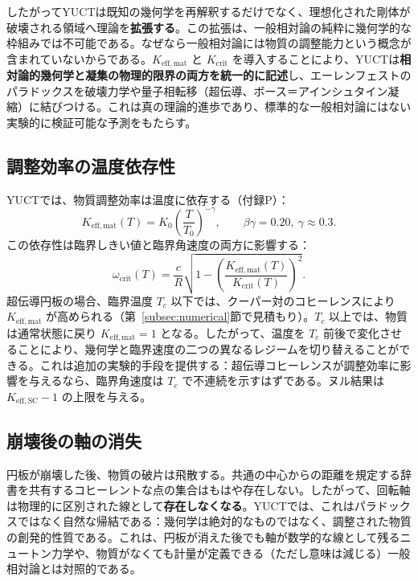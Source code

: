 \documentclass[12pt,a4paper]{article}
\newcommand{\Keffmat}{K_{\mathrm{eff,mat}}}
\newcommand{\Kcrit}{K_{\mathrm{crit}}}
\begin{document}
	したがってYUCTは既知の幾何学を再解釈するだけでなく、理想化された剛体が破壊される領域へ理論を\textbf{拡張する}。この拡張は、一般相対論の純粋に幾何学的な枠組みでは不可能である。なぜなら一般相対論には物質の調整能力という概念が含まれていないからである。\(\Keffmat\) と \(\Kcrit\) を導入することにより、YUCTは\textbf{相対論的幾何学と凝集の物理的限界の両方を統一的に記述}し、エーレンフェストのパラドックスを破壊力学や量子相転移（超伝導、ボース＝アインシュタイン凝縮）に結びつける。これは真の理論的進歩であり、標準的な一般相対論にはない実験的に検証可能な予測をもたらす。
	
	\subsection{調整効率の温度依存性}
	
	YUCTでは、物質調整効率は温度に依存する（付録P）：
	\[
	K_{\mathrm{eff,mat}}(T) = K_0 \left( \frac{T}{T_0} \right)^{-\gamma}, \qquad \beta\gamma = 0.20,\ \gamma \approx 0.3.
	\]
	この依存性は臨界しきい値と臨界角速度の両方に影響する：
	\[
	\omega_{\text{crit}}(T) = \frac{c}{R} \sqrt{1 - \left( \frac{K_{\mathrm{eff,mat}}(T)}{K_{\mathrm{crit}}(T)} \right)^2 }.
	\]
	超伝導円板の場合、臨界温度 \(T_c\) 以下では、クーパー対のコヒーレンスにより \(K_{\mathrm{eff,mat}}\) が高められる（第~\ref{subsec:numerical}節で見積もり）。\(T_c\) 以上では、物質は通常状態に戻り \(K_{\mathrm{eff,mat}} = 1\) となる。したがって、温度を \(T_c\) 前後で変化させることにより、幾何学と臨界速度の二つの異なるレジームを切り替えることができる。これは追加の実験的手段を提供する：超伝導コヒーレンスが調整効率に影響を与えるなら、臨界角速度は \(T_c\) で不連続を示すはずである。ヌル結果は \(K_{\mathrm{eff,SC}} - 1\) の上限を与える。
	
	\subsection{崩壊後の軸の消失}
	
	円板が崩壊した後、物質の破片は飛散する。共通の中心からの距離を規定する辞書を共有するコヒーレントな点の集合はもはや存在しない。したがって、回転軸は物理的に区別された線として\textbf{存在しなくなる}。YUCTでは、これはパラドックスではなく自然な帰結である：幾何学は絶対的なものではなく、調整された物質の創発的性質である。これは、円板が消えた後でも軸が数学的な線として残るニュートン力学や、物質がなくても計量が定義できる（ただし意味は減じる）一般相対論とは対照的である。
	
\end{document}
